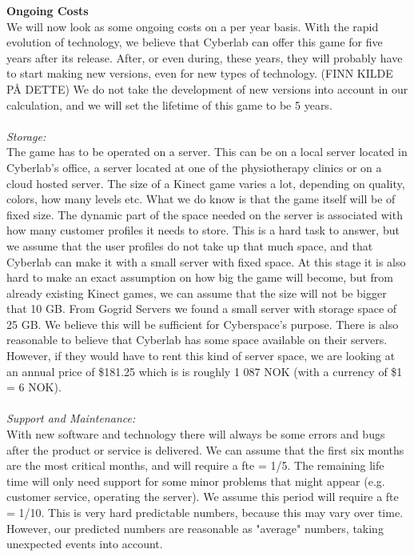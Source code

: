 \newpage
\textbf{Ongoing Costs}\\
We will now look as some ongoing costs on a per year basis. With the rapid evolution of technology, we believe that Cyberlab can offer this game for five years after its release. After, or even during, these years, they will probably have to start making new versions, even for new types of technology. (FINN KILDE PÅ DETTE) We do not take the development of new versions into account in our calculation, and we will set the lifetime of this game to be 5 years.\\ \\
\emph{Storage:}\\
The game has to be operated on a server. This can be on a local server located in Cyberlab’s office, a server located at one of the physiotherapy clinics or on a cloud hosted server. The size of a Kinect game varies a lot, depending on quality, colors, how many levels etc. What we do know is that the game itself will be of fixed size. The dynamic part of the space needed on the server is associated with how many customer profiles it needs to store. This is a hard task to answer, but we assume that the user profiles do not take up that much space, and that Cyberlab can make it with a small server with fixed space. At this stage it is also hard to make an exact assumption on how big the game will become, but from already existing Kinect games, we can assume that the size will not be bigger that 10 GB. From Gogrid Servers \cite{priceserver} we found a small server with storage space of 25 GB. We believe this will be sufficient for Cyberspace's purpose. There is also reasonable to believe that Cyberlab has some space available on their servers. However, if they would have to rent this kind of server space, we are looking at an annual price of \$181.25 which is is roughly 1 087 NOK (with a currency of \$1 = 6 NOK).\\ \\
\emph{Support and Maintenance:}\\
With new software and technology there will always be some errors and bugs after the product or service is delivered. We can assume that the first six months are the most critical months, and will require a \ac{fte} = 1/5. The remaining life time will only need support for some minor problems that might appear (e.g. customer service, operating the server). We assume this period will require a \ac{fte} = 1/10. This is very hard predictable numbers, because this may vary over time. However, our predicted numbers are reasonable as "average" numbers, taking unexpected events into account.  \\ \\
